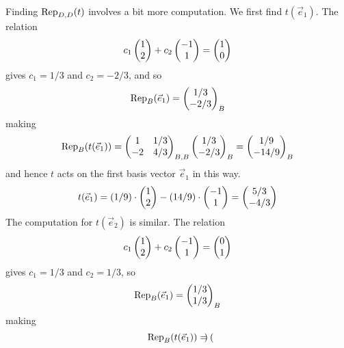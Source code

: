 \begin{exercises}
\begin{answer}
       Finding \( \rep{t}{D,D} \) involves a bit more computation.
       We first find \( t(\vec{e}_1) \).
       The relation
       \begin{equation*}
         c_1\colvec{1 \\ 2}+c_2\colvec{-1 \\ 1}=\colvec{1 \\ 0}
       \end{equation*}
       gives \( c_1=1/3 \) and \( c_2=-2/3 \), and so 
       \begin{equation*}
         \rep{\vec{e}_1}{B}=\colvec{1/3 \\ -2/3}_B
       \end{equation*}
       making
       \begin{equation*}
          \rep{t(\vec{e}_1)}{B}=
                 \begin{pmatrix}
                    1  &1/3  \\
                   -2  &4/3
                 \end{pmatrix}_{B,B}
                 \colvec{1/3 \\ -2/3}_B
                 =
                 \colvec{1/9 \\ -14/9}_B
       \end{equation*}
       and hence $t$ acts on the first basis vector $\vec{e}_1$ in this way.
       \begin{equation*}
         t(\vec{e}_1)
         =(1/9)\cdot\colvec{1 \\ 2}-(14/9)\cdot\colvec{-1 \\ 1}
         =\colvec{5/3 \\ -4/3}      
       \end{equation*}
       The computation for \( t(\vec{e}_2) \) is similar.
       The relation
       \begin{equation*}
         c_1\colvec{1 \\ 2}+c_2\colvec{-1 \\ 1}=\colvec{0 \\ 1}
       \end{equation*}
       gives \( c_1=1/3 \) and \( c_2=1/3 \), so
       \begin{equation*}
         \rep{\vec{e}_1}{B}=\colvec{1/3 \\ 1/3}_B      
       \end{equation*}
       making
       \begin{equation*}
         \rep{t(\vec{e}_1)}{B}=
                 \begin{pmatrix}

\end{pmatrix}
\end{equation*}
\end{answer}
\end{exercises}
